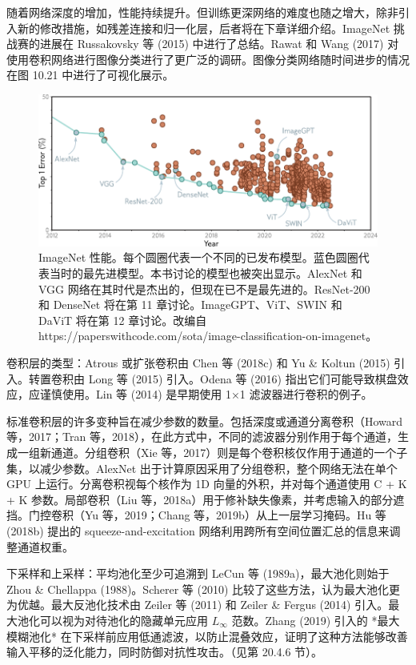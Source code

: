 \documentclass[lang=cn,newtx,10pt,scheme=chinese]{elegantbook}
\begin{document}
随着网络深度的增加，性能持续提升。但训练更深网络的难度也随之增大，除非引入新的修改措施，如残差连接和归一化层，后者将在下章详细介绍。ImageNet 挑战赛的进展在 Russakovsky 等 (2015) 中进行了总结。Rawat 和 Wang (2017) 对使用卷积网络进行图像分类进行了更广泛的调研。图像分类网络随时间进步的情况在图 10.21 中进行了可视化展示。


\begin{figure}[ht!]
	\centering
	\includegraphics[width=0.7\linewidth]{PDFFigures/UDLChap10PDF/ConvImageNetPerformance.pdf}
	\caption{ImageNet 性能。每个圆圈代表一个不同的已发布模型。蓝色圆圈代表当时的最先进模型。本书讨论的模型也被突出显示。AlexNet 和 VGG 网络在其时代是杰出的，但现在已不是最先进的。ResNet-200 和 DenseNet 将在第 11 章讨论。ImageGPT、ViT、SWIN 和 DaViT 将在第 12 章讨论。改编自 https://paperswithcode.com/sota/image-classification-on-imagenet。}
\end{figure}

卷积层的类型：Atrous 或扩张卷积由 Chen 等 (2018c) 和 Yu \& Koltun (2015) 引入。转置卷积由 Long 等 (2015) 引入。Odena 等 (2016) 指出它们可能导致棋盘效应，应谨慎使用。Lin 等 (2014) 是早期使用 1×1 滤波器进行卷积的例子。

标准卷积层的许多变种旨在减少参数的数量。包括深度或通道分离卷积（Howard 等，2017；Tran 等，2018），在此方式中，不同的滤波器分别作用于每个通道，生成一组新通道。分组卷积（Xie 等，2017）则是每个卷积核仅作用于通道的一个子集，以减少参数。AlexNet 出于计算原因采用了分组卷积，整个网络无法在单个 GPU 上运行。分离卷积视每个核作为 1D 向量的外积，并对每个通道使用 C + K + K 参数。局部卷积（Liu 等，2018a）用于修补缺失像素，并考虑输入的部分遮挡。门控卷积（Yu 等，2019；Chang 等，2019b）从上一层学习掩码。Hu 等 (2018b) 提出的 squeeze-and-excitation 网络利用跨所有空间位置汇总的信息来调整通道权重。

下采样和上采样：平均池化至少可追溯到 LeCun 等 (1989a)，最大池化则始于 Zhou \& Chellappa (1988)。Scherer 等 (2010) 比较了这些方法，认为最大池化更为优越。最大反池化技术由 Zeiler 等 (2011) 和 Zeiler \& Fergus (2014) 引入。最大池化可以视为对待池化的隐藏单元应用 \(L_{\infty}\) 范数。Zhang (2019) 引入的 *最大模糊池化* 在下采样前应用低通滤波，以防止混叠效应，证明了这种方法能够改善输入平移的泛化能力，同时防御对抗性攻击。（见第 20.4.6 节）。
\end{document}
